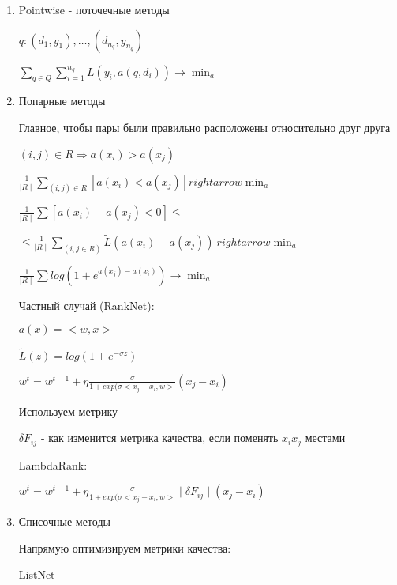 \documentclass[a4paper, 12pt]{article}
\begin{document}
\begin{enumerate}
    \item Pointwise - поточечные методы
    
    \(q: (d_1, y_1), \ldots, (d_{n_q}, y_{n_q})\)

    \(\sum_{q \in Q}\sum_{i = 1}^{n_q} L(y_i, a(q, d_i)) 
    \rightarrow \min_{a}\)

    \item Попарные методы
    
    Главное, чтобы пары были правильно расположены относительно
    друг друга

    \((i, j) \in R \Rightarrow a(x_i) > a(x_j)\)

    \(\frac{1}{\mid R \mid}\sum_{(i, j) \in R}[a(x_i) < a(x_j)]
    rightarrow \min_a\)
    
    \(\frac{1}{\mid R \mid}\sum[a(x_i) - a(x_j) < 0] \leq\)

    \(\leq \frac{1}{\mid R \mid}\sum_{(i, j \in R)}
    \tilde{L}(a(x_i) - a(x_j)) \ rightarrow \min_{a}\)

    \(\frac{1}{\mid R \mid}\sum log(1 + e^{a(x_j) - a(x_i)}) 
    \rightarrow \min_{a}\)

    Частный случай (RankNet):

    \(a(x) = <w, x>\)
    
    \(\tilde{L}(z) = log(1 + e^{-\sigma z})\)
    
    \(w^t = w^{t - 1} + \eta \frac{\sigma}
    {1 + exp(\sigma<x_j - x_i, w>}(x_j - x_i)\)

    Используем метрику

    \(\delta F_{ij}\) - как изменится метрика качества, 
    если поменять \(x_i x_j\) местами

    LambdaRank:

    \(w^t = w^{t - 1} + \eta \frac{\sigma}
    {1 + exp(\sigma<x_j - x_i, w>}\mid \delta F_{ij} \mid(x_j - x_i)\)

    \item Списочные методы
    
    Напрямую оптимизируем метрики качества:

    ListNet


\end{enumerate}
\end{document}
